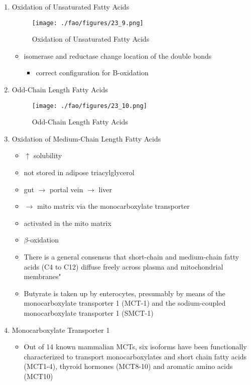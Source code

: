 \documentclass{scrartcl}
\begin{document}
\begin{enumerate}
\item Oxidation of Unsaturated Fatty Acids
\label{sec:org5b4e369}

\begin{figure}[htbp]
\centering
\texttt{[image: ./fao/figures/23\_9.png]}
\caption{\label{fig:org18e5f4d}
Oxidation of Unsaturated Fatty Acids}
\end{figure}

\begin{itemize}
\item isomerase and reductase change location of the double bonds
\begin{itemize}
\item correct configuration for B-oxidation
\end{itemize}
\end{itemize}
\item Odd-Chain Length Fatty Acids
\label{sec:org2c9d54b}
\begin{figure}[htbp]
\centering
\texttt{[image: ./fao/figures/23\_10.png]}
\caption{\label{fig:org90e64f1}
Odd-Chain Length Fatty Acids}
\end{figure}

\item Oxidation of Medium-Chain Length Fatty Acids
\label{sec:org6ee50fc}

\begin{itemize}
\item \(\uparrow\) solubility
\item not stored in adipose triacylglycerol
\item gut \(\to\) portal vein \(\to\) liver
\item \(\to\) mito matrix via the monocarboxylate transporter
\item activated in the mito matrix
\item \(\beta\)-oxidation

\item There is a general consensus that short-chain and medium-chain fatty
acids (C4 to C12) diffuse freely across plasma and mitochondrial
membranes"
\item Butyrate is taken up by enterocytes, presumably by means of the
monocarboxylate transporter 1 (MCT-1) and the sodium-coupled
monocarboxylate transporter 1 (SMCT-1)
\end{itemize}

\item Monocarboxylate Transporter 1
\label{sec:org2b80dea}
\begin{itemize}
\item Out of 14 known mammalian MCTs, six isoforms have been functionally
characterized to transport monocarboxylates and short chain fatty
acids (MCT1-4), thyroid hormones (MCT8-10) and aromatic amino
acids (MCT10)


\end{itemize}
\end{enumerate}
\end{document}
